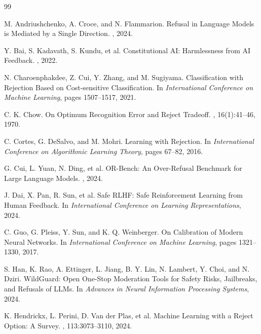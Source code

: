 \begin{thebibliography}{99}

M. Andriushchenko, A. Croce, and N. Flammarion.
\newblock Refusal in Language Models is Mediated by a Single Direction.
, 2024.

Y. Bai, S. Kadavath, S. Kundu, et al.
\newblock Constitutional AI: Harmlessness from AI Feedback.
, 2022.

N. Charoenphakdee, Z. Cui, Y. Zhang, and M. Sugiyama.
\newblock Classification with Rejection Based on Cost-sensitive Classification.
\newblock In {\em International Conference on Machine Learning}, pages 1507--1517, 2021.

C. K. Chow.
\newblock On Optimum Recognition Error and Reject Tradeoff.
, 16(1):41--46, 1970.

C. Cortes, G. DeSalvo, and M. Mohri.
\newblock Learning with Rejection.
\newblock In {\em International Conference on Algorithmic Learning Theory}, pages 67--82, 2016.

G. Cui, L. Yuan, N. Ding, et al.
\newblock OR-Bench: An Over-Refusal Benchmark for Large Language Models.
, 2024.

J. Dai, X. Pan, R. Sun, et al.
\newblock Safe RLHF: Safe Reinforcement Learning from Human Feedback.
\newblock In {\em International Conference on Learning Representations}, 2024.

C. Guo, G. Pleiss, Y. Sun, and K. Q. Weinberger.
\newblock On Calibration of Modern Neural Networks.
\newblock In {\em International Conference on Machine Learning}, pages 1321--1330, 2017.

S. Han, K. Rao, A. Ettinger, L. Jiang, B. Y. Lin, N. Lambert, Y. Choi, and N. Dziri.
\newblock WildGuard: Open One-Stop Moderation Tools for Safety Risks, Jailbreaks, and Refusals of LLMs.
\newblock In {\em Advances in Neural Information Processing Systems}, 2024.

K. Hendrickx, L. Perini, D. Van der Plas, et al.
\newblock Machine Learning with a Reject Option: A Survey.
, 113:3073--3110, 2024.


\end{thebibliography}
